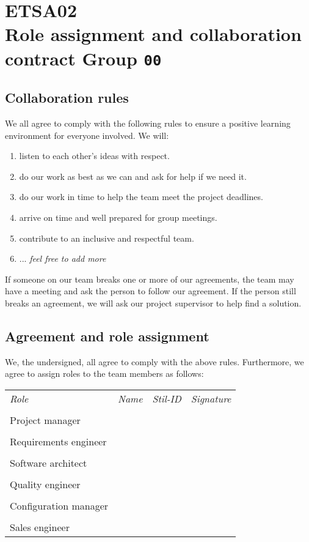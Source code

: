 \documentclass[12pt]{article}
\begin{document}
\clearpage\thispagestyle{empty}

\section*{ETSA02\\Role assignment and collaboration contract Group \texttt{00}}
\subsection*{Collaboration rules}
We all agree to comply with the following rules to ensure a positive learning environment for everyone involved. We will:
\begin{enumerate}
\item listen to each other's ideas with respect.
\item do our work as best as we can and ask for help if we need it.
\item do our work in time to help the team meet the project deadlines.
\item arrive on time and well prepared for group meetings.
\item contribute to an inclusive and respectful team.
\item ... \emph{feel free to add more}
\end{enumerate}

If someone on our team breaks one or more of our agreements, the team may have a meeting and ask the person to follow our agreement. If the person still breaks an agreement, we will ask our project supervisor to help find a solution.

\subsection*{Agreement and role assignment}
We, the undersigned, all agree to comply with the above rules. Furthermore, we agree to assign roles to the team members as follows:

\vspace{1em}

\begin{tabular}{l p{4cm} l p{4cm}}
\emph{Role} & \emph{Name} & \emph{Stil-ID} & \emph{Signature} \\
\\ Project manager & \dotfill & \dotfill & \dotfill \\
\\ Requirements engineer & \dotfill & \dotfill & \dotfill \\
\\ Software architect & \dotfill & \dotfill & \dotfill \\
\\ Quality engineer & \dotfill & \dotfill & \dotfill \\
\\ Configuration manager & \dotfill & \dotfill & \dotfill \\
\\ Sales engineer & \dotfill & \dotfill & \dotfill \\
\end{tabular}
\end{document}
